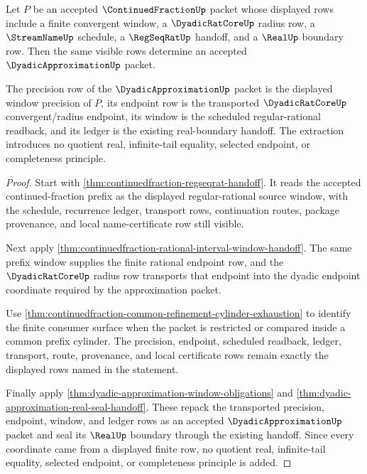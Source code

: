 \begin{theorem}
\label{thm:continuedfraction-dyadic-approximation-extraction}
Let $P$ be an accepted $\ContinuedFractionUp$ packet whose displayed rows include
a finite convergent window, a $\DyadicRatCoreUp$ radius row, a
$\StreamNameUp$ schedule, a $\RegSeqRatUp$ handoff, and a $\RealUp$ boundary
row. Then the same visible rows determine an accepted
$\DyadicApproximationUp$ packet.

The precision row of the $\DyadicApproximationUp$ packet is the displayed
window precision of $P$, its endpoint row is the transported
$\DyadicRatCoreUp$ convergent/radius endpoint, its window is the scheduled
regular-rational readback, and its ledger is the existing real-boundary
handoff. The extraction introduces no quotient real, infinite-tail equality,
selected endpoint, or completeness principle.
\end{theorem}
\begin{proof}
Start with \autoref{thm:continuedfraction-regseqrat-handoff}. It reads the
accepted continued-fraction prefix as the displayed regular-rational source
window, with the schedule, recurrence ledger, transport rows, continuation
routes, package provenance, and local name-certificate row still visible.

Next apply
\autoref{thm:continuedfraction-rational-interval-window-handoff}. The same
prefix window supplies the finite rational endpoint row, and the
$\DyadicRatCoreUp$ radius row transports that endpoint into the dyadic endpoint
coordinate required by the approximation packet.

Use \autoref{thm:continuedfraction-common-refinement-cylinder-exhaustion} to
identify the finite consumer surface when the packet is restricted or compared
inside a common prefix cylinder. The precision, endpoint, scheduled readback,
ledger, transport, route, provenance, and local certificate rows remain exactly
the displayed rows named in the statement.

Finally apply \autoref{thm:dyadic-approximation-window-obligations} and
\autoref{thm:dyadic-approximation-real-seal-handoff}. These repack the
transported precision, endpoint, window, and ledger rows as an accepted
$\DyadicApproximationUp$ packet and seal its $\RealUp$ boundary through the
existing handoff. Since every coordinate came from a displayed finite row, no
quotient real, infinite-tail equality, selected endpoint, or completeness
principle is added.
\end{proof}

